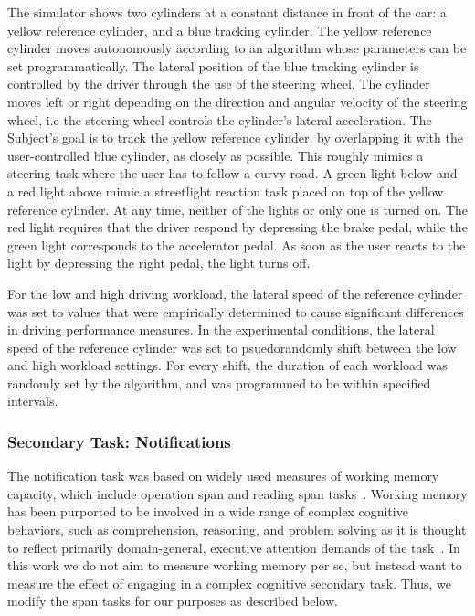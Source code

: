 The simulator shows two cylinders at a constant distance in front of the car: a yellow reference cylinder, and a blue tracking cylinder. The yellow reference cylinder moves autonomously according to an algorithm whose parameters can be set programmatically. The lateral position of the blue tracking cylinder is controlled by the driver through the use of the steering wheel. The cylinder moves left or right depending on the direction and angular velocity of the steering wheel, i.e the steering wheel controls the cylinder's lateral acceleration. The Subject's goal is to track the yellow reference cylinder, by overlapping it with the user-controlled blue cylinder, as closely as possible. This roughly mimics a steering task where the user has to follow a curvy road. A green light below and a red light above mimic a streetlight reaction task  placed on top of the yellow reference cylinder. At any time, neither of the lights or only one is turned on. The red light requires that the driver respond by depressing the brake pedal, while the green light corresponds to the accelerator pedal. As soon as the user reacts to the light by depressing the right pedal, the light turns off.

For the low and high driving workload, the lateral speed of the reference cylinder was set to values that were empirically determined to cause significant differences in driving performance measures. In the experimental conditions, the lateral speed of the reference cylinder was set to psuedorandomly shift between the low and high workload settings. For every shift, the duration of each workload was randomly set by the algorithm, and was programmed to be within specified intervals. 

\subsubsection{Secondary Task: Notifications}
The notification task was based on widely used measures of working memory capacity, which include operation span and reading span tasks~\cite{conway2005}. Working memory has been purported to be involved in a wide range of complex cognitive behaviors, such as comprehension, reasoning, and problem solving as it is thought to reflect primarily domain-general, executive attention demands of the task~\cite{engle2002}. In this work we do not aim to measure working memory per se, but instead want to measure the effect of engaging in a complex cognitive secondary task. Thus, we modify the span tasks for our purposes as described below.


